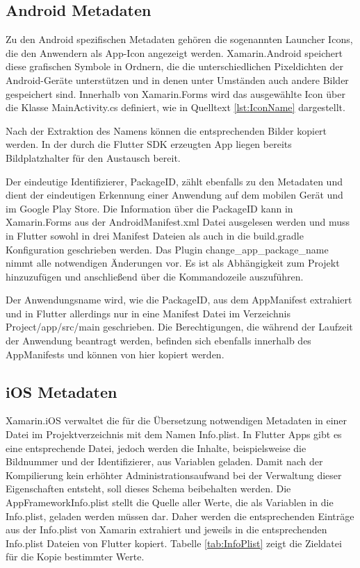 \subsection{Android Metadaten}
Zu den Android spezifischen Metadaten gehören die sogenannten Launcher Icons, die den Anwendern als App-Icon angezeigt werden. Xamarin.Android speichert diese grafischen Symbole in Ordnern, die die unterschiedlichen Pixeldichten der Android-Geräte unterstützen und in denen unter Umständen auch andere Bilder gespeichert sind.  Innerhalb von Xamarin.Forms wird das ausgewählte Icon über die Klasse  \glq MainActivity.cs\grq{}  definiert, wie in Quelltext \ref{lst:IconName} dargestellt. 



Nach der Extraktion des Namens können die entsprechenden Bilder kopiert werden.  In der durch die Flutter SDK erzeugten App liegen bereits Bildplatzhalter für den Austausch bereit.

Der eindeutige Identifizierer,  PackageID,  zählt ebenfalls zu den Metadaten und dient der eindeutigen Erkennung einer Anwendung auf dem mobilen Gerät und im Google Play Store.  Die Information über die PackageID kann in Xamarin.Forms aus der \glq AndroidManifest.xml\grq{} Datei ausgelesen werden und muss in Flutter sowohl in drei Manifest Dateien als auch in die \glq build.gradle\grq{} Konfiguration geschrieben werden.  Das Plugin \glq change\_app\_package\_name\grq{}  nimmt alle notwendigen Änderungen vor.  Es ist als Abhängigkeit zum Projekt hinzuzufügen und anschließend über die Kommandozeile auszuführen. 

Der Anwendungsname wird, wie die PackageID,  aus dem AppManifest extrahiert und in Flutter allerdings nur in eine Manifest Datei im Verzeichnis \glq Project/app/src/main\grq{} geschrieben.  Die Berechtigungen,  die während der Laufzeit der Anwendung beantragt werden,  befinden sich ebenfalls innerhalb des AppManifests und können von hier kopiert werden.

\subsection{iOS Metadaten}
Xamarin.iOS verwaltet die für die Übersetzung notwendigen Metadaten in einer Datei im  Projektverzeichnis mit dem Namen Info.plist.  In Flutter Apps gibt es eine entsprechende Datei,  jedoch werden die Inhalte,  beispielsweise die Bildnummer und der Identifizierer,  aus Variablen geladen.  Damit nach der Kompilierung kein erhöhter Administrationsaufwand bei der Verwaltung dieser Eigenschaften entsteht,  soll dieses Schema beibehalten werden.  Die AppFrameworkInfo.plist stellt die Quelle aller Werte,  die als Variablen in die \glq Info.plist\grq, geladen werden müssen dar.   Daher werden die entsprechenden Einträge aus der \glq Info.plist\grq{} von Xamarin extrahiert und jeweils in die entsprechenden \glq Info.plist\grq{} Dateien von Flutter kopiert.  Tabelle \ref{tab:InfoPlist} zeigt die Zieldatei für die Kopie bestimmter Werte.


